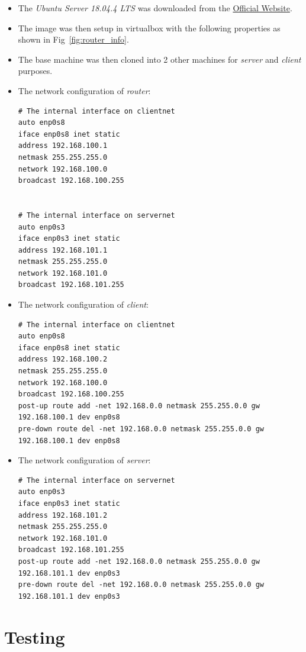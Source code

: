 \documentclass[preprint,12pt]{elsarticle}
\begin{document}
\begin{itemize}
\item The \textit{Ubuntu Server 18.04.4 LTS} was downloaded from the  \href{https://ubuntu.com/download/server}{Official Website}.

\item The image was then setup in virtualbox  with the following properties as shown in Fig~\ref{fig:router_info}.

\item The base machine was then cloned into 2 other machines for \textit{server} and \textit{client} purposes. 

\item The network configuration of \textit{router}:
\begin{lstlisting}
# The internal interface on clientnet
auto enp0s8
iface enp0s8 inet static
address 192.168.100.1
netmask 255.255.255.0
network 192.168.100.0
broadcast 192.168.100.255


# The internal interface on servernet
auto enp0s3
iface enp0s3 inet static
address 192.168.101.1
netmask 255.255.255.0
network 192.168.101.0
broadcast 192.168.101.255
\end{lstlisting}

\item The network configuration of \textit{client}:
\begin{lstlisting}
# The internal interface on clientnet
auto enp0s8
iface enp0s8 inet static
address 192.168.100.2
netmask 255.255.255.0
network 192.168.100.0
broadcast 192.168.100.255
post-up route add -net 192.168.0.0 netmask 255.255.0.0 gw 192.168.100.1 dev enp0s8
pre-down route del -net 192.168.0.0 netmask 255.255.0.0 gw 192.168.100.1 dev enp0s8
\end{lstlisting}

\item The network configuration of \textit{server}:
\begin{lstlisting}
# The internal interface on servernet
auto enp0s3
iface enp0s3 inet static
address 192.168.101.2
netmask 255.255.255.0
network 192.168.101.0
broadcast 192.168.101.255
post-up route add -net 192.168.0.0 netmask 255.255.0.0 gw 192.168.101.1 dev enp0s3
pre-down route del -net 192.168.0.0 netmask 255.255.0.0 gw 192.168.101.1 dev enp0s3
\end{lstlisting}
\end{itemize}



\section{Testing}
\label{s:Testing}
\end{document}
